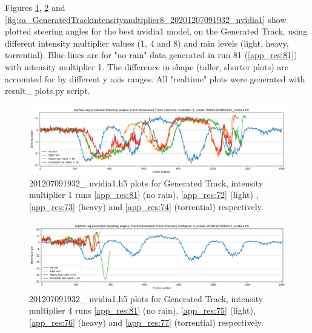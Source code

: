 Figures
\ref{fig:sa_GeneratedTrackintensitymultiplier1_20201207091932_nvidia1}, \ref{fig:sa_GeneratedTrackintensitymultiplier4_20201207091932_nvidia1} and
\ref{fig:sa_GeneratedTrackintensitymultiplier8_20201207091932_nvidia1} show plotted steering angles for the best nvidia1 model, on the Generated Track, using different intensity multiplier values (1, 4 and 8) and rain levels (light, heavy, torrential). Blue lines are for "no rain" data generated in run 81 (\ref{app_res:81}) with intensity multiplier 1. The difference in shape (taller, shorter plots) are accounted for by different y axis ranges. All "realtime" plots were generated with result\_ plots.py script.


\begin{figure}[h!]
 \centering 
 \includegraphics[width=\textwidth]{Figures/sa_GeneratedTrackintensitymultiplier1_20201207091932_nvidia1.h5.png}
 \caption{201207091932\_ nvidia1.h5 plots for Generated Track, intensity multiplier 1 runs \ref{app_res:81} (no rain), \ref{app_res:72} (light) , \ref{app_res:73} (heavy) and  \ref{app_res:74} (torrential) respectively.}
 \label{fig:sa_GeneratedTrackintensitymultiplier1_20201207091932_nvidia1} 
\end{figure}

\begin{figure}[h!]
 \centering 
 \includegraphics[width=\textwidth]{Figures/sa_GeneratedTrackintensitymultiplier4_20201207091932_nvidia1.h5.png}
 \caption{201207091932\_ nvidia1.h5 plots for Generated Track, intensity multiplier 4 runs \ref{app_res:81} (no rain),  \ref{app_res:75} (light), \ref{app_res:76} (heavy) and \ref{app_res:77} (torrential) respectively.}
 \label{fig:sa_GeneratedTrackintensitymultiplier4_20201207091932_nvidia1} 
\end{figure}

